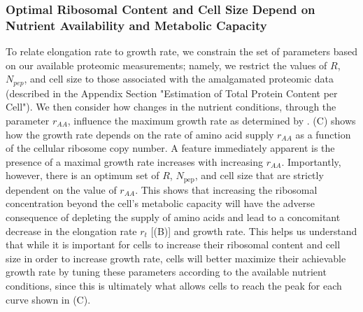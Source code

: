 {\begin{figure}
{        \label{figsupp:model_explorer}

        }
\end{figure}

\subsubsection{Optimal Ribosomal Content and Cell Size Depend on Nutrient
Availability and Metabolic Capacity}
To relate elongation rate to growth rate, we constrain the set of parameters
based on our available proteomic measurements; namely, we restrict the values of
$R$, $N_{pep}$, and cell size to those associated with the amalgamated
proteomic data (described in the Appendix Section
"Estimation of Total Protein Content per Cell"). We then consider how changes in the
nutrient conditions, through the parameter $r_{AA}$, influence the maximum
growth rate as determined by . (C)
shows how the growth rate depends on the rate of amino acid supply $r_{AA}$ as a
function of the cellular ribosome copy number. A feature immediately apparent is
the presence of a maximal growth rate increases with increasing $r_{AA}$. Importantly, however, there
is an optimum set of $R$, $N_\text{pep}$, and cell size that are strictly dependent on
the value of $r_{AA}$. This shows that increasing the ribosomal concentration
beyond the cell's metabolic capacity will have the adverse consequence of
depleting the supply of amino acids and lead to a concomitant decrease in the elongation
rate $r_t$ [(B)] and growth rate.
This helps us understand that while it is important for cells to increase
their ribosomal content and cell size in order to increase growth rate,
cells will better maximize their achievable growth rate by tuning these
parameters according to the available nutrient conditions, since this is
ultimately what allows cells to reach the peak for each curve shown in
(C).

}
